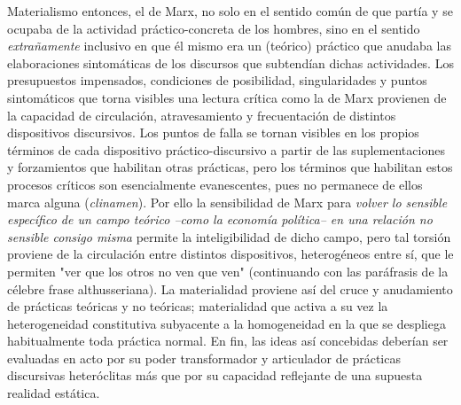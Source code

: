 \documentclass{book}
\begin{document}
Materialismo entonces, el de Marx, no solo en el sentido común de que
partía y se ocupaba de la actividad práctico-concreta de los hombres,
sino en el sentido \emph{extrañamente} inclusivo en que él mismo era un
(teórico) práctico que anudaba las elaboraciones sintomáticas de los
discursos que subtendían dichas actividades. Los presupuestos
impensados, condiciones de posibilidad, singularidades y puntos
sintomáticos que torna visibles una lectura crítica como la de Marx
provienen de la capacidad de circulación, atravesamiento y frecuentación
de distintos dispositivos discursivos. Los puntos de falla se tornan
visibles en los propios términos de cada dispositivo práctico-discursivo
a partir de las suplementaciones y forzamientos que habilitan otras
prácticas, pero los términos que habilitan estos procesos críticos son
esencialmente evanescentes, pues no permanece de ellos marca alguna
(\emph{clinamen}). Por ello la sensibilidad de Marx para \emph{volver lo
sensible específico de un campo teórico --como la economía política-- en
una relación no sensible consigo misma} permite la inteligibilidad de
dicho campo, pero tal torsión proviene de la circulación entre distintos
dispositivos, heterogéneos entre sí, que le permiten "ver que los otros
no ven que ven" (continuando con las paráfrasis de la célebre frase
althusseriana). La materialidad proviene así del cruce y anudamiento de
prácticas teóricas y no teóricas; materialidad que activa a su vez la
heterogeneidad constitutiva subyacente a la homogeneidad en la que se
despliega habitualmente toda práctica normal. En fin, las ideas así
concebidas deberían ser evaluadas en acto por su poder transformador y
articulador de prácticas discursivas heteróclitas más que por su
capacidad reflejante de una supuesta realidad estática.
\end{document}
